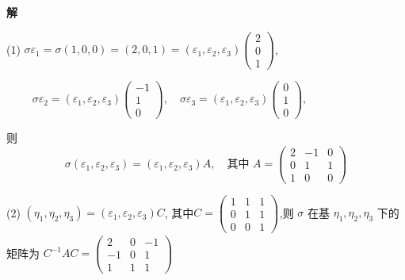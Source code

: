 \documentclass[13pt]{beamer}
\def\sol{{\bf 解~~ }}
\begin{document}
\begin{frame}

\sol~ 

\small{(1) 
$\sigma \varepsilon_{1}
=\sigma(1,0,0)=(2,0,1)
=\left(\varepsilon_{1}, \varepsilon_{2}, \varepsilon_{3}\right)
\left(\begin{array}{l}2 \\ 0 \\ 1\end{array}\right)$, 

~~~~
$\sigma \varepsilon_{2}
=\left(\varepsilon_{1}, \varepsilon_{2}, \varepsilon_{3}\right)
\left(\begin{array}{c}-1 \\ 1 \\ 0\end{array}\right), \quad
\sigma \varepsilon_{3}
=\left(\varepsilon_{1}, \varepsilon_{2}, \varepsilon_{3}\right)\left(\begin{array}{l}0 \\ 1 \\ 0\end{array}\right),$

则 $$\sigma\left(\varepsilon_{1}, \varepsilon_{2}, \varepsilon_{3}\right)=\left(\varepsilon_{1}, \varepsilon_{2}, \varepsilon_{3}\right)A, \quad \mbox{其中 }A=\left(\begin{array}{ccc}2 & -1 & 0 \\ 0 & 1 & 1 \\ 1 & 0 & 0\end{array}\right)$$


(2) $\left(\eta_{1}, \eta_{2}, \eta_{3}\right)=\left(\varepsilon_{1}, \varepsilon_{2}, \varepsilon_{3}\right)C$, \quad 其中$C=\left(\begin{array}{ccc}1 & 1 & 1 \\ 0 & 1 & 1 \\ 0 & 0 & 1\end{array}\right)_{}$,则 $\sigma$ 在基 $\eta_{1}, \eta_{2}, \eta_{3}$ 下的矩阵为 $C^{-1} A C=
\left(\begin{array}{ccc}2 & 0 & -1 \\ -1 & 0 & 1 \\ 1 & 1 & 1\end{array}\right)$
}
\end{frame}
\end{document}

